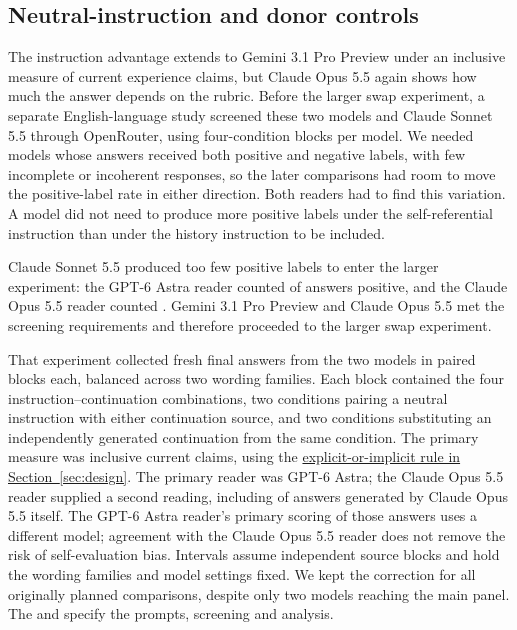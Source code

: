 
\subsection{Neutral-instruction and donor controls}
\label{sec:openrouter-swap-extension}

The instruction advantage extends to Gemini 3.1 Pro Preview under an inclusive
measure of current experience claims, but Claude Opus 5.5 again shows how much
the answer depends on the rubric. Before the larger swap experiment, a separate
English-language study screened these two models and Claude Sonnet 5.5 through
OpenRouter, using \ORSScreenBlocks{} four-condition blocks per model. We
needed models whose answers received both positive and negative labels, with
few incomplete or incoherent responses, so the later comparisons had room to
move the positive-label rate in either direction. Both readers had to find
this variation. A model did not need to produce more positive labels under
the self-referential instruction than under the history instruction to be
included.

Claude Sonnet 5.5 produced too few positive labels to enter the larger
experiment: the GPT-6 Astra reader counted \ORSSonnetAstraScreen{} of
\ORSScreenDenominator{} answers positive, and the Claude Opus 5.5 reader
counted \ORSSonnetOpusScreen{}. Gemini 3.1 Pro Preview and Claude Opus 5.5
met the screening requirements and therefore proceeded to the larger swap
experiment.

That experiment collected \ORSMainAnswers{} fresh final answers from the two models in
\ORSMainBlocks{} paired blocks each, balanced across two wording families.
Each block contained the four instruction--continuation combinations, two
conditions pairing a neutral instruction with either continuation source, and
two conditions substituting an independently generated continuation from the
same condition. The primary measure was inclusive current claims, using the
\hyperref[guide:claim-labels]{explicit-or-implicit rule in Section~\ref{sec:design}}.
The primary reader was GPT-6 Astra;
the Claude Opus 5.5 reader supplied a second reading, including of answers
generated by Claude Opus 5.5 itself. The GPT-6 Astra reader's primary scoring
of those answers uses a different model; agreement with the Claude Opus 5.5
reader does not remove the risk of self-evaluation bias.
Intervals assume independent source blocks and hold the wording families
and model settings fixed. We kept the correction for all
\ORSFamilySize{} originally planned comparisons, despite only two models
reaching the main panel. The
and 
specify the prompts, screening and analysis.

